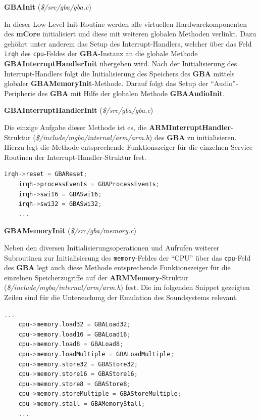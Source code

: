 \documentclass[11pt,a4paper]{scrartcl}
\newcommand{\paratitlecode}[2] {
    \vspace{5mm}
    \large \textbf{#1} \normalsize(\textit{\${#2}})
    \vspace{2mm}\newline
}
\begin{document}
\newpage
\paratitlecode{GBAInit}{/src/gba/gba.c}
In dieser Low-Level Init-Routine werden alle virtuellen Hardwarekomponenten des \textbf{mCore} initialisiert und diese mit weiteren globalen Methoden verlinkt. Dazu geh\"ohrt unter anderem das Setup des Interrupt-Handlers, welcher \"uber das Feld \verb|irqh| des \verb|cpu|-Feldes der \textbf{GBA}-Instanz an die globale Methode \textbf{GBAInterruptHandlerInit} \"ubergeben wird. Nach der Initialisierung des Interrupt-Handlers folgt die Initialisierung des Speichers des \textbf{GBA} mittels globaler \textbf{GBAMemoryInit}-Methode. Darauf folgt das Setup der \enquote{Audio}-Peripherie des \textbf{GBA} mit Hilfe der globalen Methode \textbf{GBAAudioInit}.

\paratitlecode{GBAInterruptHandlerInit}{/src/gba/gba.c}
Die einzige Aufgabe dieser Methode ist es, die \textbf{ARMInterruptHandler}-Struktur (\textit{\$/include/mgba/internal/arm/arm.h}) des \textbf{GBA} zu initialisieren. Hierzu legt die Methode entsprechende Funktionszeiger f\"ur die einzelnen Service-Routinen der Interrupt-Handler-Struktur fest.

\vspace{5mm}
\begin{lstlisting}[language=C++, caption={Ausschnitt aus der \textbf{GBAInterruptHandlerInit}-Methode}, label={list:GBAInterruptHandlerInit}]
    irqh->reset = GBAReset;
    irqh->processEvents = GBAProcessEvents;
    irqh->swi16 = GBASwi16;
    irqh->swi32 = GBASwi32;
    ...
\end{lstlisting}


\paratitlecode{GBAMemoryInit}{/src/gba/memory.c}
Neben den diversen Initialisierungsoperationen und Aufrufen weiterer Subroutinen zur Initialisierung des \verb|memory|-Feldes der \enquote{CPU} \"uber das \verb|cpu|-Feld des \textbf{GBA} legt auch diese Methode entsprechende Funktionszeiger f\"ur die einzelnen Speicherzugriffe auf der \textbf{ARMMemory}-Struktur (\textit{\$/include/mgba/internal/arm/arm.h}) fest. Die im folgenden Snippet gezeigten Zeilen sind f\"ur die Untersuchung der Emulation des Soundsystems relevant.

\vspace{5mm}
\begin{lstlisting}[language=C++, caption={Ausschnitt aus der \textbf{GBAMemoryInit}-Methode}, label={list:GBAMemoryInit}]
    ...
    cpu->memory.load32 = GBALoad32;
    cpu->memory.load16 = GBALoad16;
    cpu->memory.load8 = GBALoad8;
    cpu->memory.loadMultiple = GBALoadMultiple;
    cpu->memory.store32 = GBAStore32;
    cpu->memory.store16 = GBAStore16;
    cpu->memory.store8 = GBAStore8;
    cpu->memory.storeMultiple = GBAStoreMultiple;
    cpu->memory.stall = GBAMemoryStall;
    ...
\end{lstlisting}
\end{document}

